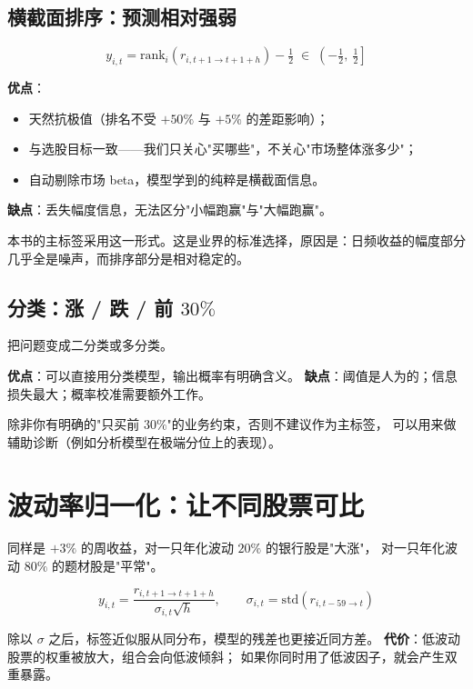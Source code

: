 \subsection{横截面排序：预测相对强弱}

\begin{equation}
  y_{i,t} = \mathrm{rank}_{i}\!\left(r_{i,t+1\rightarrow t+1+h}\right) - \tfrac12
  \;\in\; \left(-\tfrac12,\ \tfrac12\right]
  \label{eq:label-rank}
\end{equation}

\textbf{优点}：
\begin{itemize}
  \item 天然抗极值（排名不受 $+50\%$ 与 $+5\%$ 的差距影响）；
  \item 与选股目标一致——我们只关心"买哪些"，不关心"市场整体涨多少"；
  \item 自动剔除市场 beta，模型学到的纯粹是横截面信息。
\end{itemize}

\textbf{缺点}：丢失幅度信息，无法区分"小幅跑赢"与"大幅跑赢"。

本书的主标签采用这一形式。这是业界的标准选择，原因是：日频收益的幅度部分
几乎全是噪声，而排序部分是相对稳定的。

\subsection{分类：涨 / 跌 / 前 $30\%$}

把问题变成二分类或多分类。

\textbf{优点}：可以直接用分类模型，输出概率有明确含义。
\textbf{缺点}：阈值是人为的；信息损失最大；概率校准需要额外工作。

除非你有明确的"只买前 $30\%$"的业务约束，否则不建议作为主标签，
可以用来做辅助诊断（例如分析模型在极端分位上的表现）。

\section{波动率归一化：让不同股票可比}

同样是 $+3\%$ 的周收益，对一只年化波动 $20\%$ 的银行股是"大涨"，
对一只年化波动 $80\%$ 的题材股是"平常"。

\begin{equation}
  y_{i,t} = \frac{r_{i,t+1\rightarrow t+1+h}}{\sigma_{i,t}\sqrt{h}},
  \qquad \sigma_{i,t} = \mathrm{std}(r_{i,t-59\rightarrow t})
  \label{eq:label-vol}
\end{equation}

除以 $\sigma$ 之后，标签近似服从同分布，模型的残差也更接近同方差。
\textbf{代价}：低波动股票的权重被放大，组合会向低波倾斜；
如果你同时用了低波因子，就会产生双重暴露。

